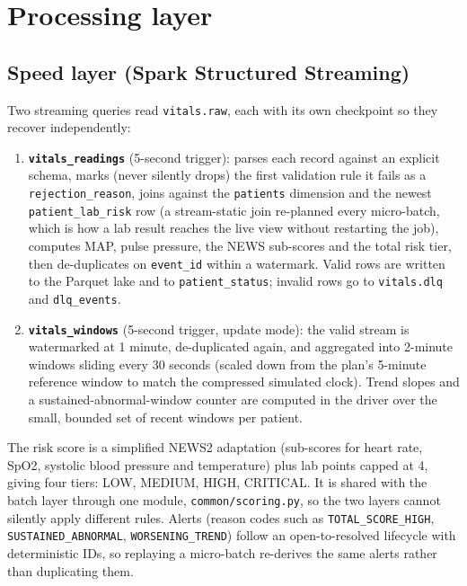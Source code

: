 \documentclass[11pt,a4paper]{article}
\newcommand{\code}[1]{\texttt{\small #1}}
\begin{document}
\section{Processing layer}

\subsection{Speed layer (Spark Structured Streaming)}

Two streaming queries read \code{vitals.raw}, each with its own checkpoint so they recover
independently:

\begin{enumerate}[label=\arabic*.]
\item \textbf{\code{vitals\_readings}} (5-second trigger): parses each record against an explicit
schema, marks (never silently drops) the first validation rule it fails as a \code{rejection\_reason},
joins against the \code{patients} dimension and the newest \code{patient\_lab\_risk} row (a
stream-static join re-planned every micro-batch, which is how a lab result reaches the live view
without restarting the job), computes MAP, pulse pressure, the NEWS sub-scores and the total risk
tier, then de-duplicates on \code{event\_id} within a watermark. Valid rows are written to the
Parquet lake and to \code{patient\_status}; invalid rows go to \code{vitals.dlq} and \code{dlq\_events}.
\item \textbf{\code{vitals\_windows}} (5-second trigger, update mode): the valid stream is
watermarked at 1 minute, de-duplicated again, and aggregated into 2-minute windows sliding every 30
seconds (scaled down from the plan's 5-minute reference window to match the compressed simulated
clock). Trend slopes and a sustained-abnormal-window counter are computed in the driver over the
small, bounded set of recent windows per patient.
\end{enumerate}

The risk score is a simplified NEWS2 adaptation (sub-scores for heart rate, SpO2, systolic blood
pressure and temperature) plus lab points capped at 4, giving four tiers: LOW, MEDIUM, HIGH,
CRITICAL. It is shared with the batch layer through one module, \code{common/scoring.py}, so the two
layers cannot silently apply different rules. Alerts (reason codes such as \code{TOTAL\_SCORE\_HIGH},
\code{SUSTAINED\_ABNORMAL}, \code{WORSENING\_TREND}) follow an open-to-resolved lifecycle with
deterministic IDs, so replaying a micro-batch re-derives the same alerts rather than duplicating them.
\end{document}
